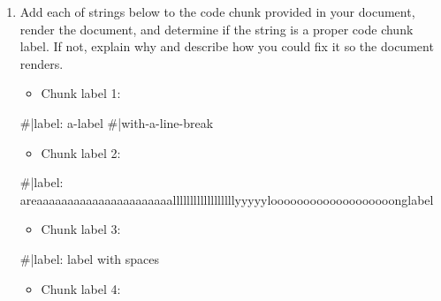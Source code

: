 \documentclass[
  letterpaper,
  DIV=11,
  numbers=noendperiod]{scrartcl}
\newenvironment{Shaded}{\begin{snugshade}}{\end{snugshade}}
\newcommand{\CommentTok}[1]{\textcolor[rgb]{0.37,0.37,0.37}{#1}}
\providecommand{\tightlist}{%
  \setlength{\itemsep}{0pt}\setlength{\parskip}{0pt}}
\begin{document}
\begin{enumerate}
\def\labelenumi{\alph{enumi}.}
\item
  Add each of strings below to the code chunk provided in your document,
  render the document, and determine if the string is a proper code
  chunk label. If not, explain why and describe how you could fix it so
  the document renders.

  \begin{itemize}
  \tightlist
  \item
    Chunk label 1:
  \end{itemize}

\begin{Shaded}
\begin{Highlighting}[]
\CommentTok{\#|label: a{-}label }
\CommentTok{\#|with{-}a{-}line{-}break}
\end{Highlighting}
\end{Shaded}

  \begin{itemize}
  \tightlist
  \item
    Chunk label 2:
  \end{itemize}

\begin{Shaded}
\begin{Highlighting}[]
\CommentTok{\#|label: areaaaaaaaaaaaaaaaaaaaaaallllllllllllllllllyyyyylooooooooooooooooooonglabel }
\end{Highlighting}
\end{Shaded}

  \begin{itemize}
  \tightlist
  \item
    Chunk label 3:
  \end{itemize}

\begin{Shaded}
\begin{Highlighting}[]
\CommentTok{\#|label: label with spaces}
\end{Highlighting}
\end{Shaded}

  \begin{itemize}
  \tightlist
  \item
    Chunk label 4:
  \end{itemize}

  \begin{tcolorbox}[enhanced jigsaw, rightrule=.15mm, breakable, left=2mm, opacitybacktitle=0.6, toptitle=1mm, colbacktitle=quarto-callout-tip-color!10!white, toprule=.15mm, title=\textcolor{quarto-callout-tip-color}{\faLightbulb}\hspace{0.5em}{Tip}, titlerule=0mm, colframe=quarto-callout-tip-color-frame, bottomrule=.15mm, colback=white, opacityback=0, coltitle=black, bottomtitle=1mm, arc=.35mm, leftrule=.75mm]


\end{tcolorbox}
\end{enumerate}
\end{document}
